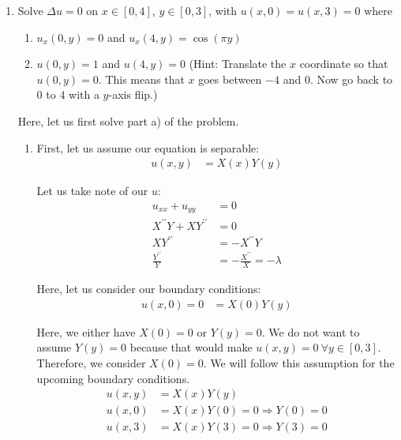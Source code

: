 \documentclass{article}
\begin{document}
%
%
\begin{enumerate}
  \item Solve $\Delta u = 0$ on $x \in [0, 4]$, $y \in [0, 3]$, with $u(x, 0) = u(x, 3) = 0$ where

  \begin{enumerate}
    \item $u_x(0, y) = 0$ and $u_x(4, y) = \cos(\pi y)$

    \item $u(0, y) = 1$ and $u(4, y) = 0$ (Hint: Translate the $x$ coordinate so that $u(0, y) = 0$. This means that $x$ goes between $-4$ and $0$. Now go back to $0$ to $4$ with a $y$-axis flip.)
  \end{enumerate}
\bigbreak
  Here, let us first solve part a) of the problem.
  \begin{enumerate}
    \item First, let us assume our equation is separable:
    \begin{align}
      u(x, y) & = X(x)Y(y)
    \end{align}

    Let us take note of our $u$:
    \begin{align}
      u_{xx} + u_{yy} & = 0\\
      X^{\prime\prime}Y + XY^{\prime\prime} & = 0\\
      XY^{\prime\prime} & = -X^{\prime\prime}Y\\
      \frac{Y^{\prime\prime}}{Y} & = - \frac{X^{\prime\prime}}{X} = -\lambda
    \end{align}

    Here, let us consider our boundary conditions:
    \begin{align}
      u(x, 0) = 0 & = X(0)Y(y)
    \end{align}

    Here, we either have $X(0) = 0$ or $Y(y) = 0$. We do not want to assume $Y(y) = 0$ because that would make $u(x, y) = 0 \ \forall y \in [0, 3]$. Therefore, we consider $X(0) = 0$. We will follow this assumption for the upcoming boundary conditions.
    \begin{align}
      u(x, y) & = X(x)Y(y)\\
      u(x, 0) & = X(x)Y(0) = 0 \Rightarrow Y(0) = 0\\
      u(x, 3) & = X(x)Y(3) = 0 \Rightarrow Y(3) = 0
    \end{align}


\end{enumerate}
\end{enumerate}
\end{document}
